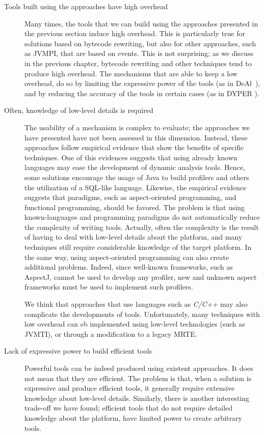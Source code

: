 \begin{description}
\item[Tools built using the approaches have high overhead]
Many times, the tools that we can build using the approaches presented in the previous section induce high overhead.
This is particularly true for solutions based on bytecode rewriting, but also for other approaches, such as JVMPI, that are based on events.
This is not surprising; as we discuss in the previous chapter, bytecode rewriting and other techniques tend to produce high overhead.
The mechanisms that are able to keep a low overhead, do so by limiting the expressive power of the tools (as in DeAl~\cite{Reichenbach:2010:GCE:1869459.1869482}), and by reducing the accuracy of the tools in certain cases (as in DYPER \cite{Reiss:2008:CDP:1383559.1383566}). 


\item[Often, knowledge of low-level details is required] 
The usability of a mechanism is complex to evaluate; the approaches we have presented have not been assessed in this dimension.
Instead, these approaches follow empirical evidence that show the benefits of specific techniques.
One of this evidences suggests that using already known languages may ease the development of dynamic analysis tools.
Hence, some solutions encourage the usage of Java to build profilers and others the utilization of a SQL-like language.
Likewise, the empirical evidence suggests that paradigms, such as aspect-oriented programming, and functional programming, should be favored.
The problem is that using known-languages and programming paradigms do not automatically reduce the complexity of writing tools.
Actually, often the complexity is the result of having to deal with low-level details about the platform,
and many techniques still require considerable knowledge of the target platform.
In the same way, using aspect-oriented programming can also create additional problems.
Indeed, since well-known frameworks, such as AspectJ, cannot be used to develop any profiler, new and unknown aspect frameworks must be used to implement such profilers.

We think that approaches that use languages such as \textit{C/C++} may also complicate the developments of tools.
Unfortunately, many techniques with low overhead can eb implemented using low-level technologies (such as JVMTI), or through a modification to a legacy MRTE.

\item[Lack of expressive power to build efficient tools] 
Powerful tools can be indeed produced using existent approaches.
It does not mean that they are efficient.
The problem is that, when a solution is expressive and produce efficient tools, it generally require extensive knowledge about low-level details.
Similarly, there is another interesting trade-off we have found; efficient tools that do not require detailed knowledge about the platform, have limited power to create arbitrary tools. 
\end{description}

